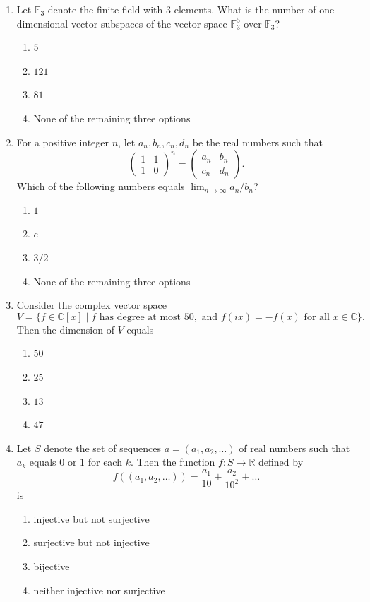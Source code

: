 \documentclass[11pt, a4paper]{article}
\begin{document}
\begin{enumerate}
  \item Let $\mathbb{F}_3$ denote the finite field with $3$ elements. What is the number of one dimensional vector subspaces of the vector space $\mathbb{F}_3^5$ over $\mathbb{F}_3$?
  \begin{enumerate}[label=(\alph*)]
    \item $5$
    \item $121$
    \item $81$
    \item None of the remaining three options
  \end{enumerate}

  \item For a positive integer $n$, let $a_n, b_n, c_n, d_n$ be the real numbers such that
  \[
    \begin{pmatrix} 1 & 1 \\ 1 & 0 \end{pmatrix}^n = \begin{pmatrix} a_n & b_n \\ c_n & d_n \end{pmatrix}.
  \]
  Which of the following numbers equals $\lim_{n \to \infty} a_n / b_n$?
  \begin{enumerate}[label=(\alph*)]
    \item $1$
    \item $e$
    \item $3/2$
    \item None of the remaining three options
  \end{enumerate}

  \item Consider the complex vector space
  \[
    V = \{f \in \mathbb{C}[x] \mid f \text{ has degree at most } 50, \text{ and } f(ix) = -f(x) \text{ for all } x \in \mathbb{C}\}.
  \]
  Then the dimension of $V$ equals
  \begin{enumerate}[label=(\alph*)]
    \item $50$
    \item $25$
    \item $13$
    \item $47$
  \end{enumerate}

  \item Let $S$ denote the set of sequences $a = (a_1, a_2, \dots)$ of real numbers such that $a_k$ equals $0$ or $1$ for each $k$. Then the function $f: S \to \mathbb{R}$ defined by
  \[
    f((a_1, a_2, \dots)) = \frac{a_1}{10} + \frac{a_2}{10^2} + \dots
  \]
  is
  \begin{enumerate}[label=(\alph*)]
    \item injective but not surjective
    \item surjective but not injective
    \item bijective
    \item neither injective nor surjective
  \end{enumerate}
\end{enumerate}
\end{document}
